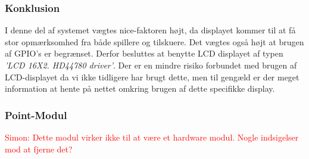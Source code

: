 \subsubsection{Konklusion}
I denne del af systemet vægtes nice-faktoren højt, da displayet kommer til at få stor opmærksomhed fra både spillere og tilskuere. Det vægtes også højt at brugen af GPIO's er begrænset. Derfor besluttes at benytte LCD displayet af typen \textit{'LCD 16X2. HD44780 driver'}. Der er en mindre risiko forbundet med brugen af LCD-displayet da vi ikke tidligere har brugt dette, men til gengæld er der meget information at hente på nettet omkring brugen af dette specifikke display. 

\subsubsection{Point-Modul}
\textcolor{red}{Simon: Dette modul virker ikke til at være et hardware modul. Nogle indsigelser mod at fjerne det?} 